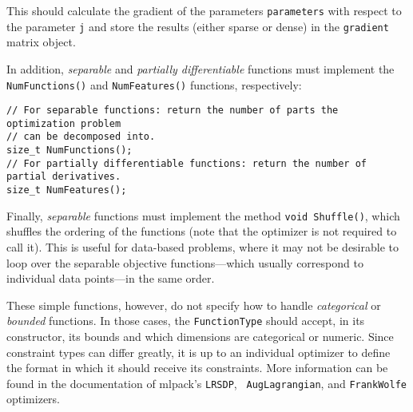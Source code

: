 \documentclass{article}
\begin{document}
This should calculate the gradient of the parameters {\tt parameters} with
respect to the parameter {\tt j} and store the results (either sparse or dense)
in the {\tt gradient} matrix object.

In addition, {\it separable} and {\it partially differentiable} functions must
implement the {\tt NumFunctions()} and {\tt NumFeatures()} functions,
respectively:

\vspace*{-0.3em}
\begin{verbatim}
// For separable functions: return the number of parts the optimization problem
// can be decomposed into.
size_t NumFunctions();
// For partially differentiable functions: return the number of partial derivatives.
size_t NumFeatures();
\end{verbatim}
\vspace*{-0.3em}

Finally, {\it separable} functions must implement the method
{\footnotesize \texttt{void Shuffle()}}, which shuffles the ordering
of the functions (note that the optimizer is not required to call it).  This is
useful for data-based problems, where it may not be desirable to loop over the
separable objective functions---which usually correspond to individual data
points---in the same order.

These simple functions, however, do not specify how to handle {\it categorical}
or {\it bounded} functions.  In those cases, the {\tt FunctionType} should
accept, in its constructor, its bounds and which dimensions are categorical or
numeric.  Since constraint types can differ greatly, it is up to an individual
optimizer to define the format in which it should receive its constraints.  More
information can be found in the documentation of mlpack's {\tt LRSDP}, {\tt
AugLagrangian}, and {\tt FrankWolfe} optimizers.


\end{document}
